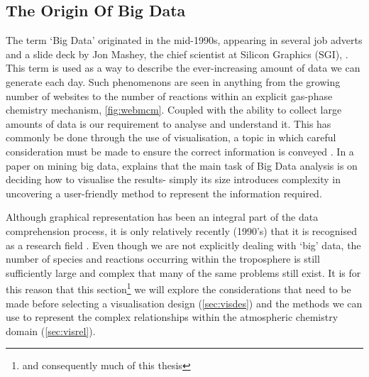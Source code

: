 %
%
%
%





\subsection{The Origin Of Big Data}
The term `Big Data' originated in the mid-1990s, appearing in several job adverts and a slide deck by Jon Mashey, the chief scientist at Silicon Graphics (SGI), \citep{slidedeck,bigdataorigin}. This term is used as a way to describe the ever-increasing amount of data we can generate each day. Such phenomenons are seen in anything from the growing number of websites to the number of reactions within an explicit gas-phase chemistry mechanism, \autoref{fig:webmcm}. Coupled with the ability to collect large amounts of data is our requirement to analyse and understand it. This has commonly be done through the use of visualisation, a topic in which careful consideration must be made to ensure the correct information is conveyed \citep{kirk}. In a paper on mining big data, \citep{bigdatamine} explains that the main task of Big Data analysis is on deciding how to visualise the results- simply its size introduces complexity in uncovering a user-friendly method to represent the information required.

Although graphical representation has been an integral part of the data comprehension process, it is only relatively recently (1990's) that it is recognised as a research field \citep{ch6}. Even though we are not explicitly dealing with `big' data, the number of species and reactions occurring within the troposphere is still sufficiently large and complex that many of the same problems still exist. It is for this reason that this section\footnote{and consequently much of this thesis} we will explore the considerations that need to be made before selecting a visualisation design (\autoref{sec:visdes}) and the methods we can use to represent the complex relationships within the atmospheric chemistry domain (\autoref{sec:visrel}).

